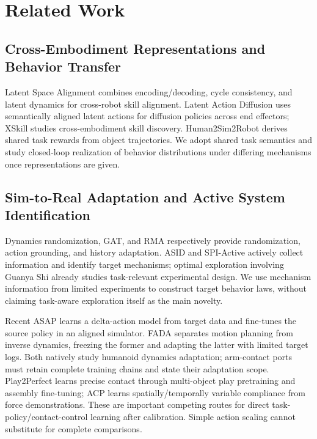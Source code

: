 \documentclass[11pt]{article}
\begin{document}
\section{Related Work}
\label{sec:related}
\subsection{Cross-Embodiment Representations and Behavior Transfer}
Latent Space Alignment combines encoding/decoding, cycle consistency, and latent dynamics for cross-robot skill alignment\cite{lsa}. Latent Action Diffusion uses semantically aligned latent actions for diffusion policies across end effectors\cite{lad}; XSkill studies cross-embodiment skill discovery\cite{xskill}. Human2Sim2Robot derives shared task rewards from object trajectories\cite{human2sim}. We adopt shared task semantics and study closed-loop realization of behavior distributions under differing mechanisms once representations are given.

\subsection{Sim-to-Real Adaptation and Active System Identification}
Dynamics randomization, GAT, and RMA respectively provide randomization, action grounding, and history adaptation\cite{dr,gat,rma}. ASID and SPI-Active actively collect information and identify target mechanisms\cite{asid,spi}; optimal exploration involving Guanya Shi already studies task-relevant experimental design\cite{optimalexploration}. We use mechanism information from limited experiments to construct target behavior laws, without claiming task-aware exploration itself as the main novelty.

Recent ASAP learns a delta-action model from target data and fine-tunes the source policy in an aligned simulator\cite{asap}. FADA separates motion planning from inverse dynamics, freezing the former and adapting the latter with limited target logs\cite{fada}. Both natively study humanoid dynamics adaptation; arm-contact ports must retain complete training chains and state their adaptation scope. Play2Perfect learns precise contact through multi-object play pretraining and assembly fine-tuning\cite{play2perfect}; ACP learns spatially/temporally variable compliance from force demonstrations\cite{acp}. These are important competing routes for direct task-policy/contact-control learning after calibration. Simple action scaling cannot substitute for complete comparisons.
\end{document}
